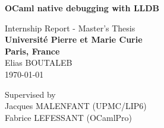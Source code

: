 \thispagestyle{empty}
\begin{center}

\vspace*{1.4cm}
{\LARGE \textbf{OCaml native debugging with LLDB}}

\begin{figure}
    \centering
    \hspace{1em}
    \hfill
\end{figure}

\vspace*{1.0cm}

{\LARGE Internship Report - Master's Thesis}\\

\vspace{1.0cm}
{\LARGE \textbf{Université Pierre et Marie Curie}}\\
\vspace*{0.3cm}
{\LARGE \textbf{Paris, France}}\\
\vspace*{1.0cm}
{\LARGE Elias BOUTALEB}
\\
\vspace*{0.5cm}
\today
\vspace*{1.0cm}

Supervised by\\
    Jacques MALENFANT (UPMC/LIP6)\\
    Fabrice LEFESSANT (OCamlPro)\\
\vspace*{0.5cm}
\vspace{3cm}


\end{center}

